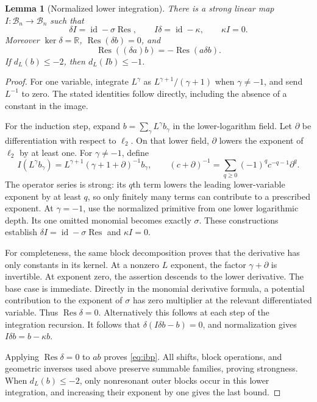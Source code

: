 \documentclass[11pt,a4paper]{article}
\numberwithin{equation}{section}
\newtheorem{lemma}[theorem]{Lemma}
\theoremstyle{definition}
\theoremstyle{remark}
\theoremstyle{definition}
\newcommand{\R}{\mathbb R}
\newcommand{\Bb}{\mathcal B}
\newcommand{\Res}{\operatorname{Res}}
\newcommand{\Id}{\operatorname{id}}
\newcommand{\dl}{d_L}
\begin{document}
\begin{lemma}[Normalized lower integration]
\label{lem:primitive}
There is a strong linear map $I:\Bb_n\to\Bb_n$ such that
\begin{equation}
 \delta I=\Id-\sigma\Res,\qquad
 I\delta=\Id-\kappa,\qquad \kappa I=0.
 \label{eq:primitive}
\end{equation}
Moreover $\ker\delta=\R$, $\Res(\delta b)=0$, and
\begin{equation}
 \Res((\delta a)b)=-\Res(a\delta b).
 \label{eq:ibp}
\end{equation}
If $\dl(b)\le-2$, then $\dl(Ib)\le-1$.
\end{lemma}
\begin{proof}
For one variable, integrate $L^\gamma$ as $L^{\gamma+1}/(\gamma+1)$ when $\gamma\ne-1$, and send $L^{-1}$ to zero. The stated identities follow directly, including the absence of a constant in the image.

For the induction step, expand $b=\sum_\gamma L^\gamma b_\gamma$ in the lower-logarithm field. Let $\partial$ be differentiation with respect to $\ell_2$. On that lower field, $\partial$ lowers the exponent of $\ell_2$ by at least one. For $\gamma\ne-1$, define
\[
 I(L^\gamma b_\gamma)
 =L^{\gamma+1}(\gamma+1+\partial)^{-1}b_\gamma,
 \qquad
 (c+\partial)^{-1}=\sum_{q\ge0}(-1)^q c^{-q-1}\partial^q.
\]
The operator series is strong: its $q$th term lowers the leading lower-variable exponent by at least $q$, so only finitely many terms can contribute to a prescribed exponent. At $\gamma=-1$, use the normalized primitive from one lower logarithmic depth. Its one omitted monomial becomes exactly $\sigma$. These constructions establish $\delta I=\Id-\sigma\Res$ and $\kappa I=0$.

For completeness, the same block decomposition proves that the derivative has only constants in its kernel. At a nonzero $L$ exponent, the factor $\gamma+\partial$ is invertible. At exponent zero, the assertion descends to the lower derivative. The base case is immediate. Directly in the monomial derivative formula, a potential contribution to the exponent of $\sigma$ has zero multiplier at the relevant differentiated variable. Thus $\Res\delta=0$. Alternatively this follows at each step of the integration recursion. It follows that $\delta(I\delta b-b)=0$, and normalization gives $I\delta b=b-\kappa b$.

Applying $\Res\delta=0$ to $ab$ proves \eqref{eq:ibp}. All shifts, block operations, and geometric inverses used above preserve summable families, proving strongness. When $\dl(b)\le-2$, only nonresonant outer blocks occur in this lower integration, and increasing their exponent by one gives the last bound.
\end{proof}
\end{document}

